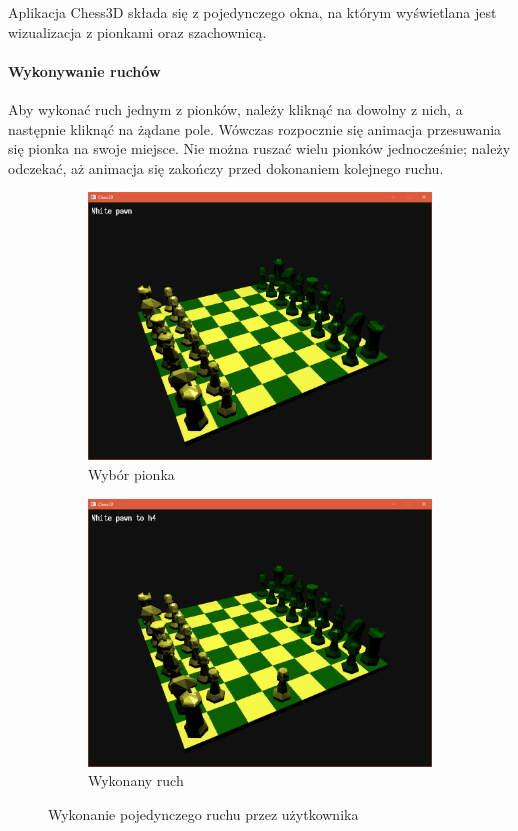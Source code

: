 \documentclass[10pt,a4paper]{article}
\begin{document}
Aplikacja Chess3D składa się z pojedynczego okna, na którym wyświetlana jest wizualizacja z pionkami oraz szachownicą.

\paragraph{Wykonywanie ruchów}
Aby wykonać ruch jednym z pionków, należy kliknąć na dowolny z nich, a następnie kliknąć na żądane pole. Wówczas rozpocznie się animacja przesuwania się pionka na swoje miejsce. Nie można ruszać wielu pionków jednocześnie; należy odczekać, aż animacja się zakończy przed dokonaniem kolejnego ruchu.

\begin{figure}[H]
	\centering
	\begin{subfigure}[b]{0.45\textwidth}
		\includegraphics[width=\textwidth]{screenshots/01_pawn_select.png}
		\caption{Wybór pionka}
	\end{subfigure}
	\begin{subfigure}[b]{0.45\textwidth}
		\includegraphics[width=\textwidth]{screenshots/02_move_complete.png}
		\caption{Wykonany ruch}
	\end{subfigure}
	\caption{Wykonanie pojedynczego ruchu przez użytkownika}
\end{figure}
\end{document}
